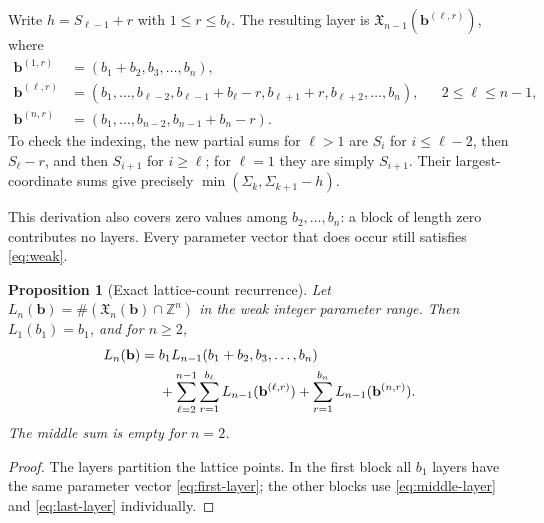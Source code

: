 \documentclass[11pt]{article}
\newtheorem{proposition}[theorem]{Proposition}
\theoremstyle{definition}
\newcommand{\Z}{\mathbb Z}
\newcommand{\bb}{\mathbf b}
\newcommand{\X}{\mathfrak X}
\numberwithin{equation}{section}
\begin{document}
Write $h=S_{\ell-1}+r$ with $1\le r\le b_\ell$. The resulting layer is
$\X_{n-1}(\bb^{(\ell,r)})$, where
\begin{align}
 \bb^{(1,r)}&=(b_1+b_2,b_3,\ldots,b_n),\label{eq:first-layer}\\
 \bb^{(\ell,r)}&=(b_1,\ldots,b_{\ell-2},
 b_{\ell-1}+b_\ell-r,b_{\ell+1}+r,b_{\ell+2},\ldots,b_n),
 &&2\le\ell\le n-1,\label{eq:middle-layer}\\
 \bb^{(n,r)}&=(b_1,\ldots,b_{n-2},b_{n-1}+b_n-r).
 \label{eq:last-layer}
\end{align}
To check the indexing, the new partial sums for $\ell>1$ are
$S_i$ for $i\le\ell-2$, then $S_\ell-r$, and then $S_{i+1}$ for
$i\ge\ell$; for $\ell=1$ they are simply $S_{i+1}$.
Their largest-coordinate sums give precisely
$\min(\Sigma_k,\Sigma_{k+1}-h)$.

This derivation also covers zero values among $b_2,\ldots,b_n$: a block
of length zero contributes no layers. Every parameter vector that does
occur still satisfies \eqref{eq:weak}.

\begin{proposition}[Exact lattice-count recurrence]
\label{prop:recurrence}
Let $L_n(\bb)=\#(\X_n(\bb)\cap\Z^n)$ in the weak integer parameter range.
Then $L_1(b_1)=b_1$, and for $n\ge2$,
\begin{align}
 L_n(\bb)={}&b_1L_{n-1}(b_1+b_2,b_3,\ldots,b_n)\notag\\
 &+\sum_{\ell=2}^{n-1}\sum_{r=1}^{b_\ell}
       L_{n-1}(\bb^{(\ell,r)})
   +\sum_{r=1}^{b_n}L_{n-1}(\bb^{(n,r)}).
 \label{eq:recurrence}
\end{align}
The middle sum is empty for $n=2$.
\end{proposition}
\begin{proof}
The layers partition the lattice points. In the first block all $b_1$ layers
have the same parameter vector \eqref{eq:first-layer}; the other blocks use
\eqref{eq:middle-layer} and \eqref{eq:last-layer} individually.
\end{proof}
\end{document}

